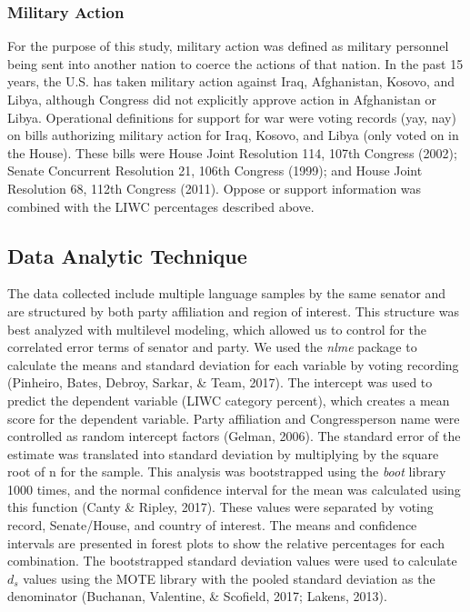 \documentclass[english,,man]{apa6}
\begin{document}
\hypertarget{military-action}{%
\subsubsection{Military Action}\label{military-action}}

For the purpose of this study, military action was defined as military personnel being sent into another nation to coerce the actions of that nation. In the past 15 years, the U.S. has taken military action against Iraq, Afghanistan, Kosovo, and Libya, although Congress did not explicitly approve action in Afghanistan or Libya. Operational definitions for support for war were voting records (yay, nay) on bills authorizing military action for Iraq, Kosovo, and Libya (only voted on in the House). These bills were House Joint Resolution 114, 107th Congress (2002); Senate Concurrent Resolution 21, 106th Congress (1999); and House Joint Resolution 68, 112th Congress (2011). Oppose or support information was combined with the LIWC percentages described above.

\hypertarget{data-analytic-technique}{%
\subsection{Data Analytic Technique}\label{data-analytic-technique}}

The data collected include multiple language samples by the same senator and are structured by both party affiliation and region of interest. This structure was best analyzed with multilevel modeling, which allowed us to control for the correlated error terms of senator and party. We used the \emph{nlme} package to calculate the means and standard deviation for each variable by voting recording (Pinheiro, Bates, Debroy, Sarkar, \& Team, 2017). The intercept was used to predict the dependent variable (LIWC category percent), which creates a mean score for the dependent variable. Party affiliation and Congressperson name were controlled as random intercept factors (Gelman, 2006). The standard error of the estimate was translated into standard deviation by multiplying by the square root of n for the sample. This analysis was bootstrapped using the \emph{boot} library 1000 times, and the normal confidence interval for the mean was calculated using this function (Canty \& Ripley, 2017). These values were separated by voting record, Senate/House, and country of interest. The means and confidence intervals are presented in forest plots to show the relative percentages for each combination. The bootstrapped standard deviation values were used to calculate \(d_s\) values using the MOTE library with the pooled standard deviation as the denominator (Buchanan, Valentine, \& Scofield, 2017; Lakens, 2013).
\end{document}
